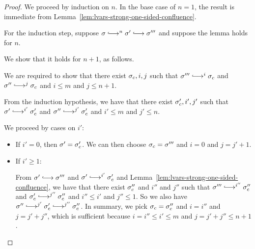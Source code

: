 \begin{proof}
  We proceed by induction on $n$.  In the base case of $n = 1$, the
  result is immediate from
  Lemma~\ref{lem:lvars-strong-one-sided-confluence}.

  For the induction step, suppose $\conf \parstepsto^n \conf'
  \parstepsto \conf'''$ and suppose the lemma holds for $n$.

  We show that it holds for $n + 1$, as follows.

  We are required to show that there exist $\sigma_c, i, j$ such that
  $\conf''' \parstepsto^i \conf_c$ and $\conf'' \parstepsto^j \conf_c$
  and $i \leq m$ and $j \leq n + 1$.

  From the induction hypothesis, we have that there exist $\sigma'_c,
  i', j'$ such that $\conf' \parstepsto^{i'} \conf'_c$ and $\conf''
  \parstepsto^{j'} \conf'_c$ and $i' \leq m$ and $j' \leq n$.

  We proceed by cases on $i'$:
  \begin{itemize}

  \item If $i' = 0$, then $\sigma' = \sigma_c'$.  We can then choose
    $\sigma_c = \sigma'''$ and $i = 0$ and $j = j' + 1$.

  \item If $i' \geq 1$:

    From $\conf' \parstepsto \conf'''$ and $\conf' \parstepsto^{i'}
    \conf_c'$ and Lemma~\ref{lem:lvars-strong-one-sided-confluence},
    we have that there exist $\sigma_c''$ and $i''$ and $j''$ such that
    $\conf''' \parstepsto^{i''} \conf_c''$ and $\conf_c'
    \parstepsto^{j''} \conf_c''$ and $i'' \leq i'$ and $j'' \leq 1$.
    So we also have $\conf'' \parstepsto^{j'} \conf_c'
    \parstepsto^{j''} \conf_c''$.  In summary, we pick $\sigma_c =
    \sigma_c''$ and $i = i''$ and $j = j' + j''$, which is sufficient
    because $i = i'' \leq i' \leq m$ and $j = j' + j'' \leq n + 1$.
  \end{itemize}

\end{proof}
